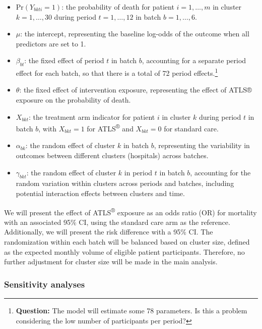 \documentclass[
]{scrartcl}
\providecommand{\tightlist}{%
  \setlength{\itemsep}{0pt}\setlength{\parskip}{0pt}}\usepackage{longtable,booktabs,array}
\begin{document}
\begin{itemize}
\tightlist
\item
  \(\text{Pr}(Y_{bkti} = 1)\): the probability of death for patient
  \(i = 1, \dotsc,m\) in cluster \(k = 1, \dotsc, 30\) during period
  \(t = 1, \dotsc, 12\) in batch \(b = 1, \dotsc, 6\).
\item
  \(\mu\): the intercept, representing the baseline log-odds of the
  outcome when all predictors are set to 1.
\item
  \(\beta_{bt}\): the fixed effect of period \(t\) in batch \(b\),
  accounting for a separate period effect for each batch, so that there
  is a total of 72 period effects.\footnote{\textbf{Question:} The model
    will estimate some 78 parameters. Is this a problem considering the
    low number of participants per period?}
\item
  \(\theta\): the fixed effect of intervention exposure, representing
  the effect of ATLS® exposure on the probability of death.
\item
  \(X_{bkt}\): the treatment arm indicator for patient \(i\) in cluster
  \(k\) during period \(t\) in batch \(b\), with \(X_{bkt} = 1\) for
  ATLS\textsuperscript{®} and \(X_{bkt} = 0\) for standard care.
\item
  \(\alpha_{bk}\): the random effect of cluster \(k\) in batch \(b\),
  representing the variability in outcomes between different clusters
  (hospitals) across batches.
\item
  \(\gamma_{bkt}\): the random effect of cluster \(k\) in period \(t\)
  in batch \(b\), accounting for the random variation within clusters
  across periods and batches, including potential interaction effects
  between clusters and time.
\end{itemize}

We will present the effect of ATLS\textsuperscript{®} exposure as an
odds ratio (OR) for mortality with an associated 95\% CI, using the
standard care arm as the reference. Additionally, we will present the
risk difference with a 95\% CI. The randomization within each batch will
be balanced based on cluster size, defined as the expected monthly
volume of eligible patient participants. Therefore, no further
adjustment for cluster size will be made in the main analysis.

\hypertarget{sensitivity-analyses}{%
\subsubsection{Sensitivity analyses}\label{sensitivity-analyses}}
\end{document}

